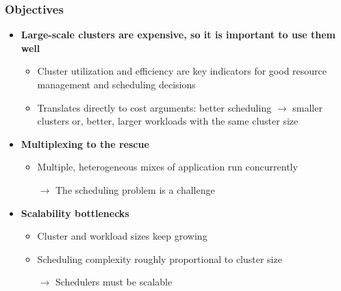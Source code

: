 \begin{frame}\frametitle{Objectives}
\begin{itemize}
	\item {\bf Large-scale clusters are expensive, so it is important to use them well}
	\begin{itemize}
		\item Cluster utilization and efficiency are key indicators for good resource management and scheduling decisions
		\item Translates directly to cost arguments: better scheduling $\to$ smaller clusters or, better, larger workloads with the same cluster size
	\end{itemize}

\vspace{10pt}

	\item {\bf Multiplexing to the rescue}
	\begin{itemize}
		\item Multiple, heterogeneous mixes of application run concurrently
		\item[$\to$] The scheduling problem is a challenge
	\end{itemize}

\vspace{10pt}

	\item {\bf Scalability bottlenecks}
	\begin{itemize}
		\item Cluster and workload sizes keep growing
		\item Scheduling complexity roughly proportional to cluster size
		\item[$\to$] Schedulers must be scalable
	\end{itemize}
\end{itemize}
\end{frame}

